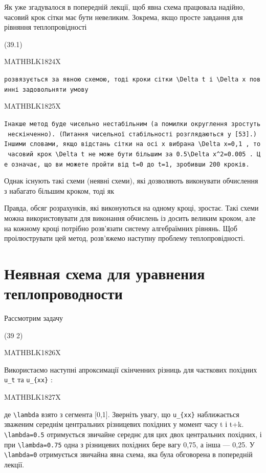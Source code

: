 \documentclass[
  ukrainian,
]{article}
\begin{document}
Як уже згадувалося в попередній лекції, щоб явна схема працювала
надійно, часовий крок сітки має бути невеликим. Зокрема, якщо просте
завдання для рівняння теплопровідності

(39.1)

MATHBLK1824X

\texttt{розв\textquotesingle{}язується\ за\ явною\ схемою,\ тоді\ кроки\ сітки\ \textquotesingle{}\textbackslash{}Delta\ t\textquotesingle{}\ і\ \textquotesingle{}\textbackslash{}Delta\ x\textquotesingle{}\ повинні\ задовольняти\ умову}

MATHBLK1825X

\texttt{Інакше\ метод\ буде\ чисельно\ нестабільним\ (а\ помилки\ округлення\ зростуть\ нескінченно).\ (Питання\ чисельної\ стабільності\ розглядаються\ у\ {[}53{]}.)\ Іншими\ словами,\ якщо\ відстань\ сітки\ на\ осі\ x\ вибрана\ \textquotesingle{}\textbackslash{}Delta\ x=0,1\textquotesingle{}\ ,\ то\ часовий\ крок\ \textquotesingle{}\textbackslash{}Delta\ t\textquotesingle{}\ не\ може\ бути\ більшим\ за\ \textquotesingle{}0.5\textbackslash{}Delta\ x\^{}2=0.005\textquotesingle{}\ .\ Це\ означає,\ що\ ви\ можете\ пройти\ від\ t=0\ до\ t=1,\ зробивши\ 200\ кроків.}

Однак існують такі схеми (неявні схеми), які дозволяють виконувати
обчислення з набагато більшим кроком, тоді як

Правда, обсяг розрахунків, які виконуються на одному кроці, зростає.
Такі схеми можна використовувати для виконання обчислень із досить
великим кроком, але на кожному кроці потрібно розв'язати систему
алгебраїмних рівнянь. Щоб проілюструвати цей метод, розв'яжемо наступну
проблему теплопровідності.

\section{Неявная схема для уравнения
теплопроводности}\label{ux43dux435ux44fux432ux43dux430ux44f-ux441ux445ux435ux43cux430-ux434ux43bux44f-ux443ux440ux430ux432ux43dux435ux43dux438ux44f-ux442ux435ux43fux43bux43eux43fux440ux43eux432ux43eux434ux43dux43eux441ux442ux438}

Рассмотрим задачу

(39 2)

MATHBLK1826X

Використаємо наступні апроксимації скінченних різниць для часткових
похідних \texttt{u\_t} та \texttt{u\_\{xx\}} :

MATHBLK1827X

де \texttt{\textbackslash{}lambda} взято з сегмента {[}0,1{]}. Зверніть
увагу, що \texttt{u\_\{xx\}} наближається зваженим середнім центральних
різницевих похідних у момент часу t і t+k.
\texttt{\textbackslash{}lambda=0.5} отримується звичайне середнє для цих
двох центральних похідних, і при \texttt{\textbackslash{}lambda=0.75}
одна з різницевих похідних бере вагу 0,75, а інша --- 0,25. У
\texttt{\textbackslash{}lambda=0} отримується звичайна явна схема, яка
була обговорена в попередній лекції.
\end{document}
